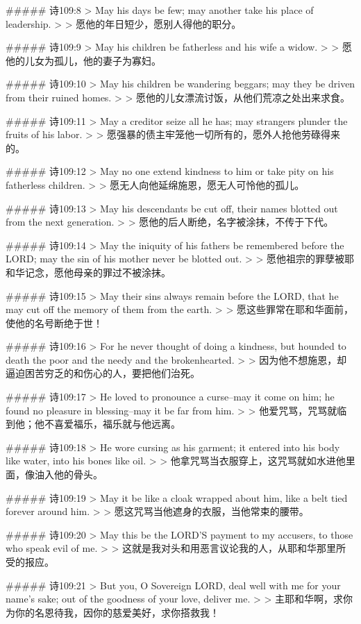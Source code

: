 ##### 诗109:8
> May his days be few; may another take his place of leadership.
>
> 愿他的年日短少，愿别人得他的职分。


##### 诗109:9
> May his children be fatherless and his wife a widow.
>
> 愿他的儿女为孤儿，他的妻子为寡妇。


##### 诗109:10
> May his children be wandering beggars; may they be driven from their ruined homes.
>
> 愿他的儿女漂流讨饭，从他们荒凉之处出来求食。


##### 诗109:11
> May a creditor seize all he has; may strangers plunder the fruits of his labor.
>
> 愿强暴的债主牢笼他一切所有的，愿外人抢他劳碌得来的。


##### 诗109:12
> May no one extend kindness to him or take pity on his fatherless children.
>
> 愿无人向他延绵施恩，愿无人可怜他的孤儿。


##### 诗109:13
> May his descendants be cut off, their names blotted out from the next generation.
>
> 愿他的后人断绝，名字被涂抹，不传于下代。


##### 诗109:14
> May the iniquity of his fathers be remembered before the LORD; may the sin of his mother never be blotted out.
>
> 愿他祖宗的罪孽被耶和华记念，愿他母亲的罪过不被涂抹。


##### 诗109:15
> May their sins always remain before the LORD, that he may cut off the memory of them from the earth.
>
> 愿这些罪常在耶和华面前，使他的名号断绝于世！


##### 诗109:16
> For he never thought of doing a kindness, but hounded to death the poor and the needy and the brokenhearted.
>
> 因为他不想施恩，却逼迫困苦穷乏的和伤心的人，要把他们治死。


##### 诗109:17
> He loved to pronounce a curse--may it come on him; he found no pleasure in blessing--may it be far from him.
>
> 他爱咒骂，咒骂就临到他；他不喜爱福乐，福乐就与他远离。


##### 诗109:18
> He wore cursing as his garment; it entered into his body like water, into his bones like oil.
>
> 他拿咒骂当衣服穿上，这咒骂就如水进他里面，像油入他的骨头。


##### 诗109:19
> May it be like a cloak wrapped about him, like a belt tied forever around him.
>
> 愿这咒骂当他遮身的衣服，当他常束的腰带。


##### 诗109:20
> May this be the LORD'S payment to my accusers, to those who speak evil of me.
>
> 这就是我对头和用恶言议论我的人，从耶和华那里所受的报应。


##### 诗109:21
> But you, O Sovereign LORD, deal well with me for your name's sake; out of the goodness of your love, deliver me.
>
> 主耶和华啊，求你为你的名恩待我，因你的慈爱美好，求你搭救我！


